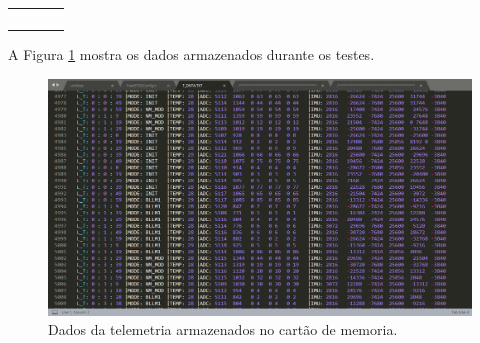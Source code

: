 \begin{longtable}[c]{clcl}
	&                                                                                                                                                                                                                                                                                                   &           &                               \\
	&                                                                                                                                                                                                                                                                                                   &           &                               \\
	&                                                                                                                                                                                                                                                                                                   &           &                               \\
	&                                                                                                                                                                                                                                                                                                   &           &                              
\end{longtable}

A Figura \ref{telemetryData} mostra os dados armazenados durante os testes.

\begin{figure}[h]
	\centering
	\caption{Dados da telemetria armazenados no cartão de memoria.}
	\includegraphics[keepaspectratio=true,scale=0.50]{figuras/telemetryData.PNG}
	
	\label{telemetryData}
\end{figure}

